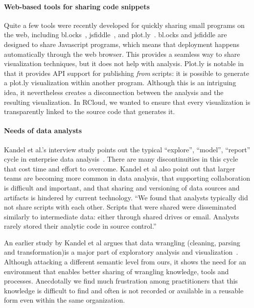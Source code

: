 \paragraph*{Web-based tools for sharing code snippets}
Quite a few tools were recently developed for quickly
sharing small programs on the web, including
bl.ocks~\cite{blocks}, jsfiddle~\cite{jsfiddle}, and
plot.ly~\cite{plotly}. bl.ocks and jsfiddle are designed to
share Javascript programs, which means that deployment happens
automatically through the web browser. This provides a seamless
way to share visualization techniques, but it does not help with
analysis.
Plot.ly is notable in that it
provides API support for publishing \emph{from} scripts: 
it is possible to generate a plot.ly visualization within
another program. Although this is an intriguing idea, it
nevertheless creates a disconnection between the analysis and the
resulting visualization. In RCloud, we wanted to ensure that every
visualization is transparently linked to the source code that
generates it.

\paragraph*{Needs of data analysts}
Kandel et al.'s interview study points out the typical ``explore'',
``model'', ``report'' cycle in enterprise data
analysis~\cite{Kandel:2012:EDA}. There are many discontinuities in
this cycle that cost time and effort to overcome.
Kandel et al also point out that larger teams
are becoming more common in data analysis, that supporting
collaboration is difficult and important, and that sharing
and versioning of data sources and artifacts is hindered by current
technology. ``We found that analysts typically did not
share scripts with each other. Scripts that were shared were
disseminated similarly to intermediate data: either through shared
drives or email. Analysts rarely stored their analytic code in source
control.''

An earlier study by Kandel et al argues that data wrangling
(cleaning, parsing and transformation)is a major part of exploratory
analysis and visualization~\cite{Kandel:2011:RDI}.
Although attacking a different semantic level from ours, it shows
the need for an environment that enables better sharing
of wrangling knowledge, tools and processes. Anecdotally
we find much frustration among practitioners that this knowledge
is difficult to find and often is not recorded or available in a
reusable form even within the same organization.


